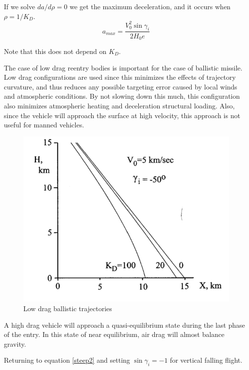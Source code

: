 \documentclass{article}
\theoremstyle{definition}
\begin{document}
If we solve $da/d\rho = 0$ we get the maximum deceleration, and it occurs when $\rho = 1/K_D$.
\begin{equation}
    a_{max} = \frac{V_0^2 \sin{\gamma_i}}{2H_0 e}
\end{equation}

Note that this does not depend on $K_D$. \medskip

The case of low drag reentry bodies is important for the case of ballistic missile.
Low drag configurations are used since this minimizes the effects of trajectory curvature, and thus reduces any possible targeting error caused by local winds and atmospheric conditions.
By not slowing down this much, this configuration also minimizes atmospheric heating and deceleration structural loading.
Also, since the vehicle will approach the surface at high velocity, this approach is not useful for manned vehicles.

\begin{figure}
    \centering
    \includegraphics[scale=0.4]{image 20.png}
    \caption{Low drag ballistic trajectories}
    \label{fig:low drag}
\end{figure}

\medskip

A high drag vehicle will approach a quasi-equilibrium state during the last phase of the entry. 
In this state of near equilibrium, air drag will almost balance gravity.

Returning to equation \ref{steep2} and setting $\sin{\gamma_i} = -1$ for  vertical falling flight.
\end{document}
